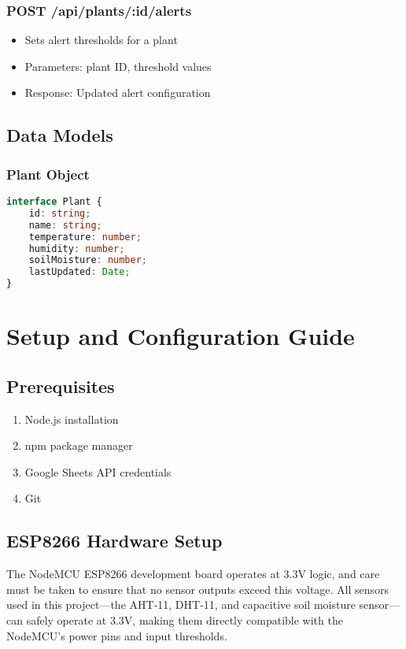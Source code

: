 \documentclass[12pt,a4paper]{article}
\begin{document}
\subsubsection{POST /api/plants/:id/alerts}
\begin{itemize}[leftmargin=*]
    \item Sets alert thresholds for a plant
    \item Parameters: plant ID, threshold values
    \item Response: Updated alert configuration
\end{itemize}

\subsection{Data Models}

\subsubsection{Plant Object}
\begin{lstlisting}[language=typescript]
interface Plant {
    id: string;
    name: string;
    temperature: number;
    humidity: number;
    soilMoisture: number;
    lastUpdated: Date;
}
\end{lstlisting}

\section{Setup and Configuration Guide}

\subsection{Prerequisites}
\begin{enumerate}[leftmargin=*]
    \item Node.js installation
    \item npm package manager
    \item Google Sheets API credentials
    \item Git
\end{enumerate}

\subsection{ESP8266 Hardware Setup}

The NodeMCU ESP8266 development board operates at 3.3V logic, and care must be taken to ensure that no sensor outputs exceed this voltage. All sensors used in this project—the AHT-11, DHT-11, and capacitive soil moisture sensor—can safely operate at 3.3V, making them directly compatible with the NodeMCU's power pins and input thresholds.
\end{document}
